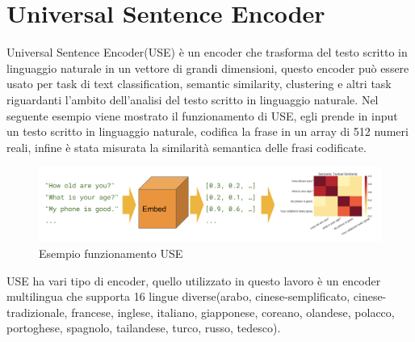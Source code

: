 \section{Universal Sentence Encoder}
Universal Sentence Encoder(USE) è un encoder che trasforma del testo scritto in linguaggio naturale in un vettore di grandi dimensioni, questo encoder può essere usato per task di text classification, semantic similarity, clustering e altri task riguardanti l'ambito dell'analisi del testo scritto in linguaggio naturale.\newline
Nel seguente esempio viene mostrato il funzionamento di USE, egli prende in input un testo scritto in linguaggio naturale, codifica la frase in un array di 512 numeri reali, infine è stata misurata la similarità semantica delle frasi codificate.
\begin{figure}[h]
    \centering
    \includegraphics [scale=0.42]{Figure/use.png}
    \caption{Esempio funzionamento USE}
    \label{fig:my_label}
\end{figure}
USE ha vari tipo di encoder, quello utilizzato in questo lavoro è un encoder multilingua che supporta 16 lingue diverse(arabo, cinese-semplificato, cinese-tradizionale, francese, inglese, italiano, giapponese, coreano, olandese, polacco, portoghese, spagnolo, tailandese, turco, russo, tedesco).
